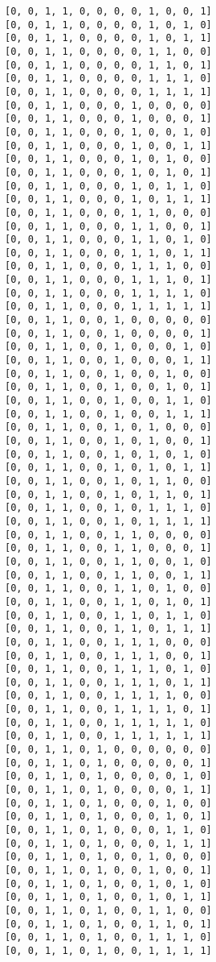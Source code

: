 \documentclass[11pt]{article}
\begin{document}
\begin{Verbatim}[commandchars=\\\{\}]
[0, 0, 1, 1, 0, 0, 0, 0, 1, 0, 0, 1]
[0, 0, 1, 1, 0, 0, 0, 0, 1, 0, 1, 0]
[0, 0, 1, 1, 0, 0, 0, 0, 1, 0, 1, 1]
[0, 0, 1, 1, 0, 0, 0, 0, 1, 1, 0, 0]
[0, 0, 1, 1, 0, 0, 0, 0, 1, 1, 0, 1]
[0, 0, 1, 1, 0, 0, 0, 0, 1, 1, 1, 0]
[0, 0, 1, 1, 0, 0, 0, 0, 1, 1, 1, 1]
[0, 0, 1, 1, 0, 0, 0, 1, 0, 0, 0, 0]
[0, 0, 1, 1, 0, 0, 0, 1, 0, 0, 0, 1]
[0, 0, 1, 1, 0, 0, 0, 1, 0, 0, 1, 0]
[0, 0, 1, 1, 0, 0, 0, 1, 0, 0, 1, 1]
[0, 0, 1, 1, 0, 0, 0, 1, 0, 1, 0, 0]
[0, 0, 1, 1, 0, 0, 0, 1, 0, 1, 0, 1]
[0, 0, 1, 1, 0, 0, 0, 1, 0, 1, 1, 0]
[0, 0, 1, 1, 0, 0, 0, 1, 0, 1, 1, 1]
[0, 0, 1, 1, 0, 0, 0, 1, 1, 0, 0, 0]
[0, 0, 1, 1, 0, 0, 0, 1, 1, 0, 0, 1]
[0, 0, 1, 1, 0, 0, 0, 1, 1, 0, 1, 0]
[0, 0, 1, 1, 0, 0, 0, 1, 1, 0, 1, 1]
[0, 0, 1, 1, 0, 0, 0, 1, 1, 1, 0, 0]
[0, 0, 1, 1, 0, 0, 0, 1, 1, 1, 0, 1]
[0, 0, 1, 1, 0, 0, 0, 1, 1, 1, 1, 0]
[0, 0, 1, 1, 0, 0, 0, 1, 1, 1, 1, 1]
[0, 0, 1, 1, 0, 0, 1, 0, 0, 0, 0, 0]
[0, 0, 1, 1, 0, 0, 1, 0, 0, 0, 0, 1]
[0, 0, 1, 1, 0, 0, 1, 0, 0, 0, 1, 0]
[0, 0, 1, 1, 0, 0, 1, 0, 0, 0, 1, 1]
[0, 0, 1, 1, 0, 0, 1, 0, 0, 1, 0, 0]
[0, 0, 1, 1, 0, 0, 1, 0, 0, 1, 0, 1]
[0, 0, 1, 1, 0, 0, 1, 0, 0, 1, 1, 0]
[0, 0, 1, 1, 0, 0, 1, 0, 0, 1, 1, 1]
[0, 0, 1, 1, 0, 0, 1, 0, 1, 0, 0, 0]
[0, 0, 1, 1, 0, 0, 1, 0, 1, 0, 0, 1]
[0, 0, 1, 1, 0, 0, 1, 0, 1, 0, 1, 0]
[0, 0, 1, 1, 0, 0, 1, 0, 1, 0, 1, 1]
[0, 0, 1, 1, 0, 0, 1, 0, 1, 1, 0, 0]
[0, 0, 1, 1, 0, 0, 1, 0, 1, 1, 0, 1]
[0, 0, 1, 1, 0, 0, 1, 0, 1, 1, 1, 0]
[0, 0, 1, 1, 0, 0, 1, 0, 1, 1, 1, 1]
[0, 0, 1, 1, 0, 0, 1, 1, 0, 0, 0, 0]
[0, 0, 1, 1, 0, 0, 1, 1, 0, 0, 0, 1]
[0, 0, 1, 1, 0, 0, 1, 1, 0, 0, 1, 0]
[0, 0, 1, 1, 0, 0, 1, 1, 0, 0, 1, 1]
[0, 0, 1, 1, 0, 0, 1, 1, 0, 1, 0, 0]
[0, 0, 1, 1, 0, 0, 1, 1, 0, 1, 0, 1]
[0, 0, 1, 1, 0, 0, 1, 1, 0, 1, 1, 0]
[0, 0, 1, 1, 0, 0, 1, 1, 0, 1, 1, 1]
[0, 0, 1, 1, 0, 0, 1, 1, 1, 0, 0, 0]
[0, 0, 1, 1, 0, 0, 1, 1, 1, 0, 0, 1]
[0, 0, 1, 1, 0, 0, 1, 1, 1, 0, 1, 0]
[0, 0, 1, 1, 0, 0, 1, 1, 1, 0, 1, 1]
[0, 0, 1, 1, 0, 0, 1, 1, 1, 1, 0, 0]
[0, 0, 1, 1, 0, 0, 1, 1, 1, 1, 0, 1]
[0, 0, 1, 1, 0, 0, 1, 1, 1, 1, 1, 0]
[0, 0, 1, 1, 0, 0, 1, 1, 1, 1, 1, 1]
[0, 0, 1, 1, 0, 1, 0, 0, 0, 0, 0, 0]
[0, 0, 1, 1, 0, 1, 0, 0, 0, 0, 0, 1]
[0, 0, 1, 1, 0, 1, 0, 0, 0, 0, 1, 0]
[0, 0, 1, 1, 0, 1, 0, 0, 0, 0, 1, 1]
[0, 0, 1, 1, 0, 1, 0, 0, 0, 1, 0, 0]
[0, 0, 1, 1, 0, 1, 0, 0, 0, 1, 0, 1]
[0, 0, 1, 1, 0, 1, 0, 0, 0, 1, 1, 0]
[0, 0, 1, 1, 0, 1, 0, 0, 0, 1, 1, 1]
[0, 0, 1, 1, 0, 1, 0, 0, 1, 0, 0, 0]
[0, 0, 1, 1, 0, 1, 0, 0, 1, 0, 0, 1]
[0, 0, 1, 1, 0, 1, 0, 0, 1, 0, 1, 0]
[0, 0, 1, 1, 0, 1, 0, 0, 1, 0, 1, 1]
[0, 0, 1, 1, 0, 1, 0, 0, 1, 1, 0, 0]
[0, 0, 1, 1, 0, 1, 0, 0, 1, 1, 0, 1]
[0, 0, 1, 1, 0, 1, 0, 0, 1, 1, 1, 0]
[0, 0, 1, 1, 0, 1, 0, 0, 1, 1, 1, 1]

\end{Verbatim}
\end{document}
